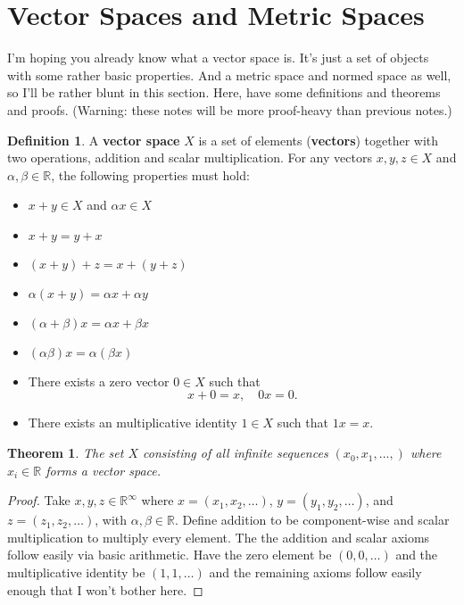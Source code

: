 \documentclass[12pt]{article}
\newcommand{\R}{\mathbb{R}}
\newtheorem{theorem}{Theorem}
\theoremstyle{definition}
\newtheorem{definition}{Definition}
\begin{document}
\maketitle
\onehalfspace





\section{Vector Spaces and Metric Spaces}

I'm hoping you already know what a vector space is. It's just a set of objects with some rather basic properties. And a metric space and normed space as well, so I'll be rather blunt in this section. Here, have some definitions and theorems and proofs. (Warning: these notes will be more proof-heavy than previous notes.)

\begin{definition}
A \textbf{vector space} $X$ is a set of elements (\textbf{vectors}) together with two operations, addition and scalar multiplication. For any vectors $x, y,z \in X$ and $\alpha, \beta \in \R$, the following properties must hold:
\begin{itemize}
	\itemsep0em
	\item $x + y \in X$ and $\alpha x \in X$
	\item $x + y = y + x$
	\item $(x + y) + z = x + (y  +z)$
	\item $\alpha(x+y) = \alpha x + \alpha y$
	\item $(\alpha + \beta)x = \alpha x + \beta x$
	\item $(\alpha \beta) x = \alpha (\beta x)$
	\item There exists a zero vector $0 \in X$ such that 
		\[x + 0=x, \quad 0x = 0.\]
	\item There exists an multiplicative identity $1 \in X$ such that $1x=x$. 
\end{itemize}
\end{definition}

\begin{theorem}
	The set $X$ consisting of all infinite sequences $(x_0, x_1, ..., )$ where $x_i \in \R$ forms a vector space. \label{infinitevectorspace}
\end{theorem}
\begin{proof}	
	Take $x,y,z \in \R^{\infty}$ where $x=(x_1, x_2, \hdots )$, $y=(y_1, y_2, \hdots)$, and $z=(z_1, z_2, \hdots)$, with $\alpha, \beta \in \R$. Define addition to be component-wise and scalar multiplication to multiply every element. The the addition and scalar axioms follow easily via basic arithmetic. Have the zero element be $(0, 0, \hdots)$ and the multiplicative identity be $(1, 1, \hdots)$ and the remaining axioms follow easily enough that I won't bother here. 
\end{proof}
\end{document}
